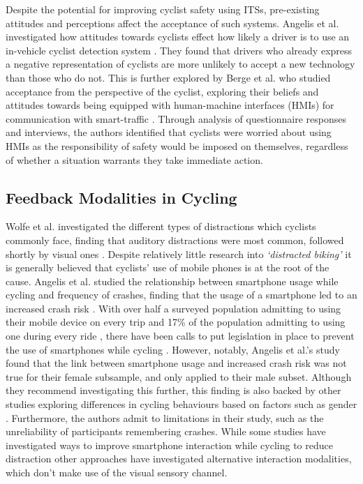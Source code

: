 \documentclass{interim}
\begin{document}
Despite the potential for improving cyclist safety using ITSs, pre-existing attitudes and perceptions affect the acceptance of such systems. Angelis et al. investigated how attitudes towards cyclists effect how likely a driver is to use an in-vehicle cyclist detection system \cite{de2017negative}. They found that drivers who already express a negative representation of cyclists are more unlikely to accept a new technology than those who do not. This is further explored by Berge et al. who studied acceptance from the perspective of the cyclist, exploring their beliefs and attitudes towards being equipped with human-machine interfaces (HMIs) for communication with smart-traffic \cite{berge2022cyclists}. Through analysis of questionnaire responses and interviews, the authors identified that cyclists were worried about using HMIs as the responsibility of safety would be imposed on themselves, regardless of whether a situation warrants they take immediate action. 


\subsection{Feedback Modalities in Cycling}
Wolfe et al. investigated the different types of distractions which cyclists commonly face, finding that auditory distractions were most common, followed shortly by visual ones \cite{wolfe2016distracted}. Despite relatively little research into \textit{‘distracted biking’} \cite{mwakalonge2014distracted} it is generally believed that cyclists’ use of mobile phones is at the root of the cause. Angelis et al. studied the relationship between smartphone usage while cycling and frequency of crashes, finding that the usage of a smartphone led to an increased crash risk \cite{doi:10.1080/19439962.2019.1591559}. With over half a surveyed population admitting to using their mobile device on every trip \cite{GOLDENBELD20121} and 17\% of the population admitting to using one during every ride \cite{goldenbeld2010use}, there have been calls to put legislation in place to prevent the use of smartphones while cycling \cite{banphoneuse}. However, notably, Angelis et al.'s study found that the link between smartphone usage and increased crash risk was not true for their female subsample, and only applied to their male subset. Although they recommend investigating this further, this finding is also backed by other studies exploring differences in cycling behaviours based on factors such as gender \cite{BEHNOOD201735}. Furthermore, the authors admit to limitations in their study, such as the unreliability of participants remembering crashes. While some studies have investigated ways to improve smartphone interaction while cycling to reduce distraction \cite{10.1145/3544548.3580971, 10.1145/3152832.3152871} other approaches have investigated alternative interaction modalities, which don’t make use of the visual sensory channel.
\end{document}
